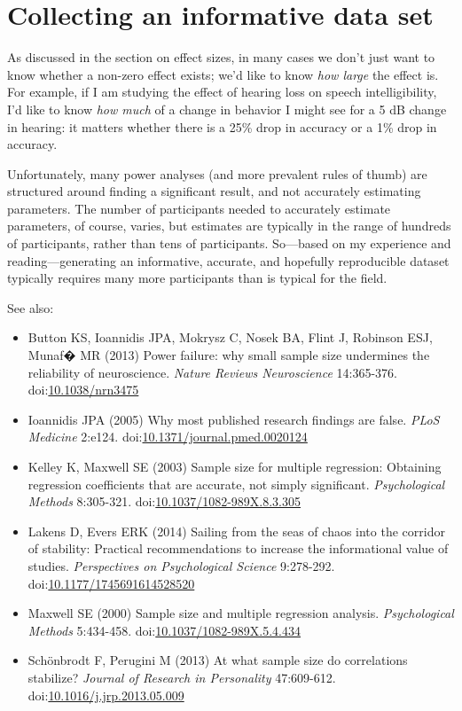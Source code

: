 \documentclass[letterpaper,oneside,11pt,article, portrait]{memoir}
\newcommand{\doi}[1]{doi:\href{http://dx.doi.org/#1}{#1}}
\newcommand{\journal}[1]{\textit{#1}} 			%
\begin{document}
\chapter{Collecting an informative data set} \label{n}

As discussed in the section on effect sizes, in many cases we don't just want to know whether a non-zero effect exists; we'd like to know \textit{how large} the effect is. For example, if I am studying the effect of hearing loss on speech intelligibility, I'd like to know \textit{how much} of a change in behavior I might see for a 5 dB change in hearing: it matters whether there is a 25\% drop in accuracy or a 1\% drop in accuracy.

Unfortunately, many power analyses (and more prevalent rules of thumb) are structured around finding a significant result, and not accurately estimating parameters. The number of participants needed to accurately estimate parameters, of course, varies, but estimates are typically in the range of hundreds of participants, rather than tens of participants. So---based on my experience and reading---generating an informative, accurate, and hopefully reproducible dataset typically requires many more participants than is typical for the field.

\vspace{1em} \noindent See also:

\begin{itemize}
\item Button KS, Ioannidis JPA, Mokrysz C, Nosek BA, Flint J, Robinson ESJ, Munaf� MR (2013) Power failure: why small sample size undermines the reliability of neuroscience. \journal{Nature Reviews Neuroscience} 14:365-376. \doi{10.1038/nrn3475}

\item Ioannidis JPA (2005) Why most published research findings are false. \journal{PLoS Medicine} 2:e124. \doi{10.1371/journal.pmed.0020124}

\item Kelley K, Maxwell SE (2003) Sample size for multiple regression: Obtaining regression coefficients that are accurate, not simply significant. \journal{Psychological Methods} 8:305-321. \doi{10.1037/1082-989X.8.3.305}

\item Lakens D, Evers ERK (2014) Sailing from the seas of chaos into the corridor of stability: Practical recommendations to increase the informational value of studies. \journal{Perspectives on Psychological Science} 9:278-292. \doi{10.1177/1745691614528520}

\item Maxwell SE (2000) Sample size and multiple regression analysis. \journal{Psychological Methods} 5:434-458. \doi{10.1037/1082-989X.5.4.434}

\item Sch\"{o}nbrodt F, Perugini M (2013) At what sample size do correlations stabilize? \journal{Journal of Research in Personality} 47:609-612. \doi{10.1016/j.jrp.2013.05.009}

\end{itemize}
\end{document}
